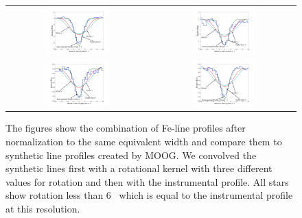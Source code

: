 \begin{figure}[h!]
\begin{tabular}{cc}
\includegraphics[width=0.45\textwidth, trim=130 30 60 0]{chapter_sn1572_hires/plots/stara_rotation.pdf} &
\includegraphics[width=0.45\textwidth, trim=130 30 60 0]{chapter_sn1572_hires/plots/starc_rotation.pdf} \\
\includegraphics[width=0.45\textwidth, trim=130 30 60 0]{chapter_sn1572_hires/plots/stare_rotation.pdf} &
\includegraphics[width=0.45\textwidth, trim=130 30 60 0]{chapter_sn1572_hires/plots/starg_rotation.pdf} \\
\end{tabular}
\caption{The figures show the combination of Fe-line profiles after normalization to the same equivalent width and compare them to synthetic line profiles created by MOOG. We convolved the synthetic lines first with a rotational kernel with three different values for rotation and then with the instrumental profile. All stars show rotation less than 6 \kms\ which is equal to the instrumental profile at this resolution. }
\label{fig:rotvel}
\end{figure}

